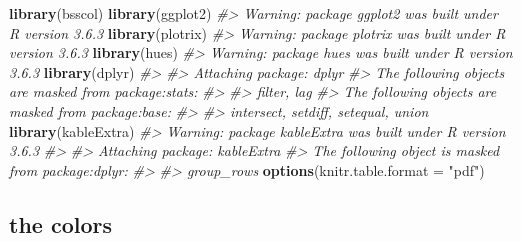 \documentclass[
]{article}
\newenvironment{Shaded}{\begin{snugshade}}{\end{snugshade}}
\newcommand{\CommentTok}[1]{\textcolor[rgb]{0.56,0.35,0.01}{\textit{#1}}}
\newcommand{\DataTypeTok}[1]{\textcolor[rgb]{0.13,0.29,0.53}{#1}}
\newcommand{\KeywordTok}[1]{\textcolor[rgb]{0.13,0.29,0.53}{\textbf{#1}}}
\newcommand{\NormalTok}[1]{#1}
\newcommand{\StringTok}[1]{\textcolor[rgb]{0.31,0.60,0.02}{#1}}
\begin{document}
\begin{Shaded}
\begin{Highlighting}[]
\KeywordTok{library}\NormalTok{(bsscol)}
\KeywordTok{library}\NormalTok{(ggplot2)}
\CommentTok{\#\textgreater{} Warning: package \textquotesingle{}ggplot2\textquotesingle{} was built under R version 3.6.3}
\KeywordTok{library}\NormalTok{(plotrix)}
\CommentTok{\#\textgreater{} Warning: package \textquotesingle{}plotrix\textquotesingle{} was built under R version 3.6.3}
\KeywordTok{library}\NormalTok{(hues)}
\CommentTok{\#\textgreater{} Warning: package \textquotesingle{}hues\textquotesingle{} was built under R version 3.6.3}
\KeywordTok{library}\NormalTok{(dplyr)}
\CommentTok{\#\textgreater{} }
\CommentTok{\#\textgreater{} Attaching package: \textquotesingle{}dplyr\textquotesingle{}}
\CommentTok{\#\textgreater{} The following objects are masked from \textquotesingle{}package:stats\textquotesingle{}:}
\CommentTok{\#\textgreater{} }
\CommentTok{\#\textgreater{}     filter, lag}
\CommentTok{\#\textgreater{} The following objects are masked from \textquotesingle{}package:base\textquotesingle{}:}
\CommentTok{\#\textgreater{} }
\CommentTok{\#\textgreater{}     intersect, setdiff, setequal, union}
\KeywordTok{library}\NormalTok{(kableExtra)}
\CommentTok{\#\textgreater{} Warning: package \textquotesingle{}kableExtra\textquotesingle{} was built under R version 3.6.3}
\CommentTok{\#\textgreater{} }
\CommentTok{\#\textgreater{} Attaching package: \textquotesingle{}kableExtra\textquotesingle{}}
\CommentTok{\#\textgreater{} The following object is masked from \textquotesingle{}package:dplyr\textquotesingle{}:}
\CommentTok{\#\textgreater{} }
\CommentTok{\#\textgreater{}     group\_rows}
\KeywordTok{options}\NormalTok{(}\DataTypeTok{knitr.table.format =} \StringTok{"pdf"}\NormalTok{)}
\end{Highlighting}
\end{Shaded}

\hypertarget{the-colors}{%
\subsection{the colors}\label{the-colors}}
\end{document}

